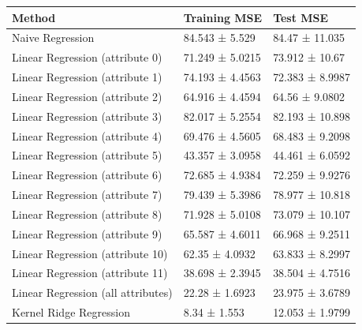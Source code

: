 \begin{tabular}{lll}
\toprule
Method & Training MSE & Test MSE \\
\midrule
Naive Regression & 84.543 ± 5.529 & 84.47 ± 11.035 \\
Linear Regression (attribute 0) & 71.249 ± 5.0215 & 73.912 ± 10.67 \\
Linear Regression (attribute 1) & 74.193 ± 4.4563 & 72.383 ± 8.9987 \\
Linear Regression (attribute 2) & 64.916 ± 4.4594 & 64.56 ± 9.0802 \\
Linear Regression (attribute 3) & 82.017 ± 5.2554 & 82.193 ± 10.898 \\
Linear Regression (attribute 4) & 69.476 ± 4.5605 & 68.483 ± 9.2098 \\
Linear Regression (attribute 5) & 43.357 ± 3.0958 & 44.461 ± 6.0592 \\
Linear Regression (attribute 6) & 72.685 ± 4.9384 & 72.259 ± 9.9276 \\
Linear Regression (attribute 7) & 79.439 ± 5.3986 & 78.977 ± 10.818 \\
Linear Regression (attribute 8) & 71.928 ± 5.0108 & 73.079 ± 10.107 \\
Linear Regression (attribute 9) & 65.587 ± 4.6011 & 66.968 ± 9.2511 \\
Linear Regression (attribute 10) & 62.35 ± 4.0932 & 63.833 ± 8.2997 \\
Linear Regression (attribute 11) & 38.698 ± 2.3945 & 38.504 ± 4.7516 \\
Linear Regression (all attributes) & 22.28 ± 1.6923 & 23.975 ± 3.6789 \\
Kernel Ridge Regression & 8.34 ± 1.553 & 12.053 ± 1.9799 \\
\bottomrule
\end{tabular}
